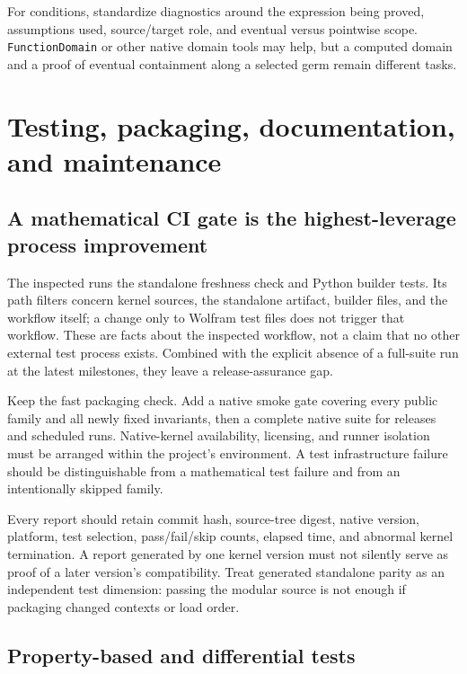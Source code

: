 For conditions, standardize diagnostics around the expression being proved, assumptions used, source/target role, and eventual versus pointwise scope. \texttt{FunctionDomain} or other native domain tools may help, but a computed domain and a proof of eventual containment along a selected germ remain different tasks.\cite{wl-functiondomain,inverseexpressions}

\section{Testing, packaging, documentation, and maintenance}

\subsection{A mathematical CI gate is the highest-leverage process improvement}

The inspected  runs the standalone freshness check and Python builder tests. Its path filters concern kernel sources, the standalone artifact, builder files, and the workflow itself; a change only to Wolfram test files does not trigger that workflow. These are facts about the inspected workflow, not a claim that no other external test process exists. Combined with the explicit absence of a full-suite run at the latest milestones, they leave a release-assurance gap.\cite{ci,validation}

Keep the fast packaging check. Add a native smoke gate covering every public family and all newly fixed invariants, then a complete native suite for releases and scheduled runs. Native-kernel availability, licensing, and runner isolation must be arranged within the project's environment. A test infrastructure failure should be distinguishable from a mathematical test failure and from an intentionally skipped family.

Every report should retain commit hash, source-tree digest, native version, platform, test selection, pass/fail/skip counts, elapsed time, and abnormal kernel termination. A report generated by one kernel version must not silently serve as proof of a later version's compatibility. Treat generated standalone parity as an independent test dimension: passing the modular source is not enough if packaging changed contexts or load order.

\subsection{Property-based and differential tests}

